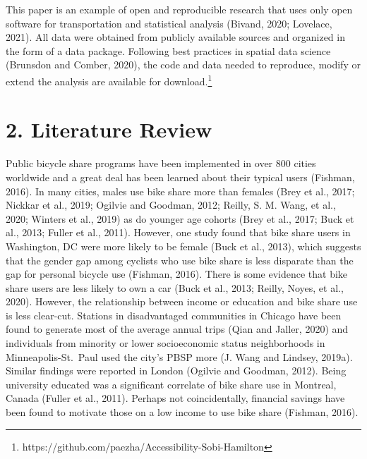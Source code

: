 \documentclass[]{elsarticle} %
\begin{document}
This paper is an example of open and reproducible research that uses
only open software for transportation and statistical analysis (Bivand,
2020; Lovelace, 2021). All data were obtained from publicly available
sources and organized in the form of a data package. Following best
practices in spatial data science (Brunsdon and Comber, 2020), the code
and data needed to reproduce, modify or extend the analysis are
available for download.\footnote{https://github.com/paezha/Accessibility-Sobi-Hamilton}

\hypertarget{literature-review}{%
\section{2. Literature Review}\label{literature-review}}

Public bicycle share programs have been implemented in over 800 cities
worldwide and a great deal has been learned about their typical users
(Fishman, 2016). In many cities, males use bike share more than females
(Brey et al., 2017; Nickkar et al., 2019; Ogilvie and Goodman, 2012;
Reilly, S. M. Wang, et al., 2020; Winters et al., 2019) as do younger
age cohorts (Brey et al., 2017; Buck et al., 2013; Fuller et al., 2011).
However, one study found that bike share users in Washington, DC were
more likely to be female (Buck et al., 2013), which suggests that the
gender gap among cyclists who use bike share is less disparate than the
gap for personal bicycle use (Fishman, 2016). There is some evidence
that bike share users are less likely to own a car (Buck et al., 2013;
Reilly, Noyes, et al., 2020). However, the relationship between income
or education and bike share use is less clear-cut. Stations in
disadvantaged communities in Chicago have been found to generate most of
the average annual trips (Qian and Jaller, 2020) and individuals from
minority or lower socioeconomic status neighborhoods in
Minneapolis-St.~Paul used the city's PBSP more (J. Wang and Lindsey,
2019a). Similar findings were reported in London (Ogilvie and Goodman,
2012). Being university educated was a significant correlate of bike
share use in Montreal, Canada (Fuller et al., 2011). Perhaps not
coincidentally, financial savings have been found to motivate those on a
low income to use bike share (Fishman, 2016).
\end{document}
